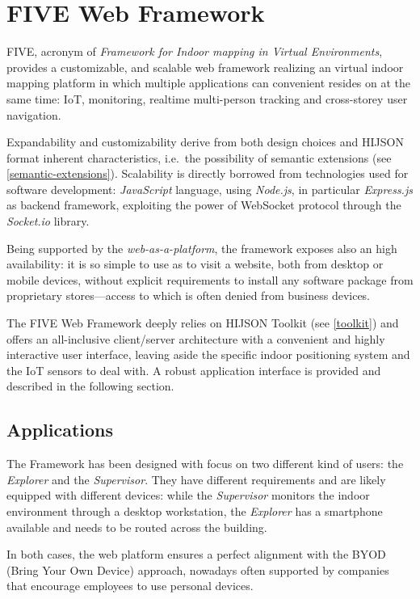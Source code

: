 \section{FIVE Web Framework}\label{framework}

FIVE, acronym of \emph{Framework for Indoor mapping in Virtual Environments},
provides a customizable, and scalable web framework realizing an virtual
indoor mapping platform in which multiple applications can convenient resides
on at the same time: IoT,  monitoring, realtime multi-person tracking and
cross-storey user navigation.

Expandability and customizability derive from both design choices and
HIJSON format inherent characteristics, i.e.~the possibility of semantic extensions (see \ref{semantic-extensions}).
Scalability is directly borrowed from technologies used for
software development: \emph{JavaScript} language, using \emph{Node.js},
in particular \emph{Express.js} as backend framework, exploiting the
power of WebSocket protocol through the \emph{Socket.io} library.

Being supported by the \emph{web-as-a-platform}, the framework exposes
also an high availability: it is so simple to use as to visit a
website, both from desktop or mobile devices, without explicit
requirements to install any software package from proprietary stores---access to
which is often denied from business devices.

The FIVE Web Framework deeply relies on HIJSON Toolkit (see \ref{toolkit}) and offers an
all-inclusive client/server architecture with a convenient and highly interactive
user interface, leaving aside the specific indoor positioning system and
the IoT sensors to deal with. A robust application interface is provided and
described in the following section.

\subsection{Applications}\label{applications}

The Framework has been designed with focus on two different kind of
users: the \emph{Explorer} and the \emph{Supervisor}. They have
different requirements and are likely equipped with different devices:
while the \emph{Supervisor} monitors the indoor environment through a
desktop workstation, the \emph{Explorer} has a smartphone available and
needs to be routed across the building.

In both cases, the web platform ensures a perfect alignment with the
BYOD (Bring Your Own Device) approach, nowadays often supported by companies
that encourage employees to use personal devices.


